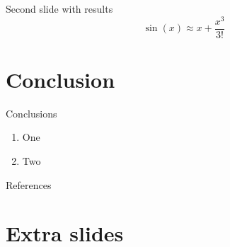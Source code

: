 \documentclass[
aspectratio=169,
16pt,
xcolor={dvipsnames} %
]{beamer}
\begin{document}
\begin{frame}[c]{Second slide with results}
	\[
	\sin(x) \approx x + \frac{x^3}{3!}
	\]
\end{frame}

\section{Conclusion}
\begin{frame}[c]{Conclusions}
	\begin{enumerate}
		\item One
		\item Two
	\end{enumerate}
\end{frame}

\begin{frame}[c]{References}
	\printbibliography
\end{frame}
	
	
\section{Extra slides}
\end{document}
